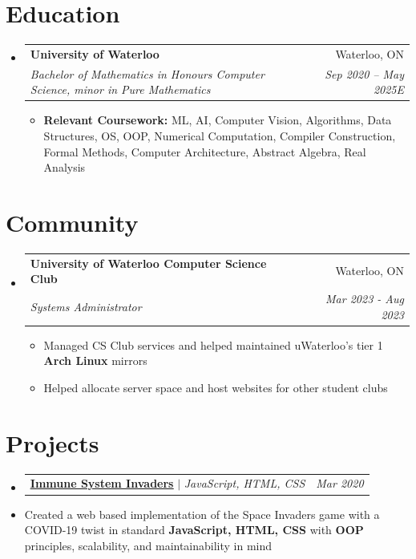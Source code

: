 \documentclass[letterpaper,11pt]{article}
\makeatletter
\newcommand{\resumeItem}[1]{
  \item\small{
    {#1 \vspace{-2pt}}
  }
}
\newcommand{\resumeSubheading}[4]{
  \vspace{-2pt}\item
    \begin{tabular*}{0.97\textwidth}[t]{l@{\extracolsep{\fill}}r}
      \textbf{#1} & #2 \\
      \textit{\small#3} & \textit{\small #4} \\
    \end{tabular*}\vspace{-7pt}
}
\newcommand{\resumeProjectHeading}[2]{
    \item
    \begin{tabular*}{0.97\textwidth}{l@{\extracolsep{\fill}}r}
      \small#1 & #2 \\
    \end{tabular*}\vspace{-7pt}
}
\newcommand{\resumeSubHeadingListStart}{\begin{itemize}[leftmargin=0.15in, label={}]}
\newcommand{\resumeSubHeadingListEnd}{\end{itemize}}
\newcommand{\resumeItemListStart}{\begin{itemize}}
\newcommand{\resumeItemListEnd}{\end{itemize}\vspace{-5pt}}
\makeatother
\begin{document}
      
  

\section{Education}
  \resumeSubHeadingListStart
    \resumeSubheading
      {University of Waterloo}{Waterloo, ON}
      {Bachelor of Mathematics in Honours Computer Science, minor in Pure Mathematics}{Sep 2020 -- May 2025E}
      \resumeItemListStart
      \resumeItem{\textbf{Relevant Coursework:} ML, AI, Computer Vision, Algorithms, Data Structures, OS, OOP, Numerical Computation, Compiler Construction, Formal Methods, Computer Architecture, Abstract Algebra, Real Analysis}
      \resumeItemListEnd
  \resumeSubHeadingListEnd


\section{Community}
    \resumeSubHeadingListStart

    \resumeSubheading
      {University of Waterloo Computer Science Club}{Waterloo, ON}
      {Systems Administrator} {Mar 2023 - Aug 2023}
      \resumeItemListStart
      \resumeItem{Managed CS Club services and helped maintained uWaterloo's tier 1 \textbf{Arch Linux} mirrors}
        \resumeItem{Helped allocate server space and host websites for other student clubs}
      \resumeItemListEnd
    
    \resumeSubHeadingListEnd



    
\section{Projects}
    \resumeSubHeadingListStart
    \resumeProjectHeading
    {\href{https://jiafengyu.github.io/ISI/game.html} {\textbf{\underline{Immune System Invaders}}} $|$ \emph{JavaScript, HTML, CSS}} {\emph{Mar 2020}}
          \item
              Created a web based implementation of the Space Invaders game with a COVID-19 twist in standard \textbf{JavaScript, HTML, CSS} with \textbf{OOP} principles, scalability, and maintainability in mind
      
    \resumeSubHeadingListEnd

%
\end{document}
